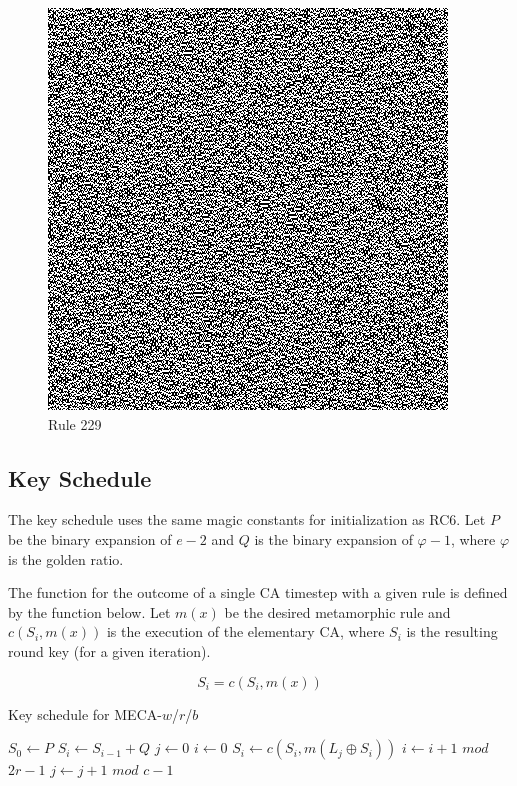 \documentclass{article}
\begin{document}
\begin{figure}[H]
  \begin{center}
    \begin{minipage}{0.48\textwidth}
      \caption{Rule 229}
      \label{fig:figure10}
      \centering
      \includegraphics[scale=.5]{229.png}
    \end{minipage}
  \end{center}
\end{figure}

\subsection{Key Schedule}

The key schedule uses the same magic constants for initialization as RC6. Let $P$ be the binary expansion of $e-2$ and $Q$ is the binary expansion of $\varphi-1$, where $\varphi$ is the golden ratio.

The function for the outcome of a single CA timestep with a given rule is defined by the function below. Let $m(x)$ be the desired metamorphic rule and $c(S_i, m(x))$ is the execution of the elementary CA, where $S_i$ is the resulting round key (for a given iteration).

$$
 S_i = c(S_i, m(x)) 
$$

\begin{algorithm}[H]
  \begin{algorithmic}
    \caption{Key schedule for MECA-$w$/$r$/$b$}\label{alg:schedule}
    \Input
    \EndInput
    \Output
    \EndOutput
    \State $S_0 \gets P$
      \State $S_i \gets S_{i-1} + Q$
    \EndFor
    \State $j \gets 0$
    \State $i \gets 0$
      \State $S_i \gets c(S_i, m(L_j \oplus S_i))$ 
      \State $i \gets i+1$ $mod$ $2r-1$
      \State $j \gets j+1$ $mod$ $c-1$
    \EndFor
  \end{algorithmic}
\end{algorithm}
\end{document}
